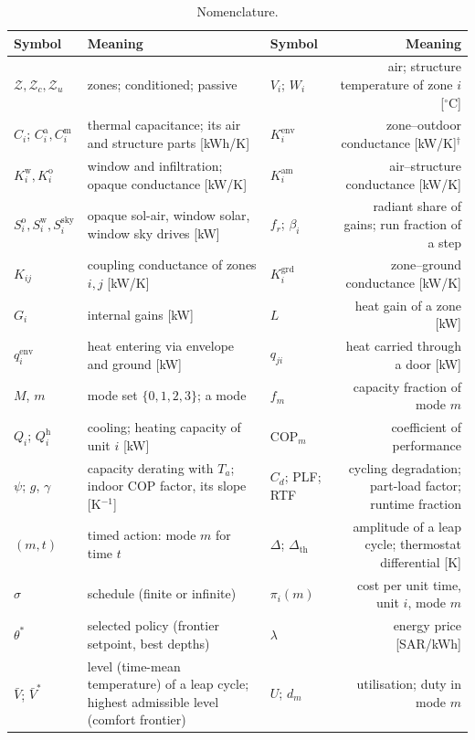\documentclass[10pt,a4paper,twocolumn]{article}
\theoremstyle{definition}
\begin{document}
\begin{table}[!t]
\caption{Nomenclature.}\label{tab:nomenclature}
\footnotesize
\begin{tabularx}{\linewidth}{@{}L{1.9cm}L{6.1cm}@{\hspace{3mm}}L{1.9cm}R@{}}
\toprule
Symbol & Meaning & Symbol & Meaning \\
\midrule
$\mathcal{Z},\mathcal{Z}_c,\mathcal{Z}_u$ & zones; conditioned; passive & $V_i$; $W_i$ & air; structure temperature of zone $i$ [$^{\circ}$C] \\
$C_i$; $C^{\mathrm{a}}_i,C^{\mathrm{m}}_i$ & thermal capacitance; its air and structure parts [kWh/K] & $K^{\mathrm{env}}_i$ & zone--outdoor conductance [kW/K]$^{\dagger}$ \\
$K^{\mathrm{w}}_i,K^{\mathrm{o}}_i$ & window and infiltration; opaque conductance [kW/K] & $K^{\mathrm{am}}_i$ & air--structure conductance [kW/K] \\
$S^{\mathrm{o}}_i,S^{\mathrm{w}}_i,S^{\mathrm{sky}}_i$ & opaque sol-air, window solar, window sky drives [kW] & $f_r$; $\beta_i$ & radiant share of gains; run fraction of a step \\
$K_{ij}$ & coupling conductance of zones $i,j$ [kW/K] & $K^{\mathrm{grd}}_i$ & zone--ground conductance [kW/K] \\
$G_i$ & internal gains [kW] & $L$ & heat gain of a zone [kW] \\
$q^{\mathrm{env}}_i$ & heat entering via envelope and ground [kW] & $q_{ji}$ & heat carried through a door [kW] \\
$M$, $m$ & mode set $\{0,1,2,3\}$; a mode & $f_m$ & capacity fraction of mode $m$ \\
$Q_i$; $Q^{\mathrm{h}}_i$ & cooling; heating capacity of unit $i$ [kW] & $\mathrm{COP}_m$ & coefficient of performance \\
$\psi$; $g$, $\gamma$ & capacity derating with $T_a$; indoor COP factor, its slope [K$^{-1}$] & $C_d$; PLF; RTF & cycling degradation; part-load factor; runtime fraction \\
$(m,t)$ & timed action: mode $m$ for time $t$ & $\Delta$; $\Delta_{\text{th}}$ & amplitude of a leap cycle; thermostat differential [K] \\
$\sigma$ & schedule (finite or infinite) & $\pi_i(m)$ & cost per unit time, unit $i$, mode $m$ \\
$\theta^\ast$ & selected policy (frontier setpoint, best depths) & $\lambda$ & energy price [SAR/kWh] \\
$\bar V$; $\bar V^\ast$ & level (time-mean temperature) of a leap cycle; highest admissible level (comfort frontier) & $U$; $d_m$ & utilisation; duty in mode $m$ \\

\end{tabularx}
\end{table}
\end{document}
